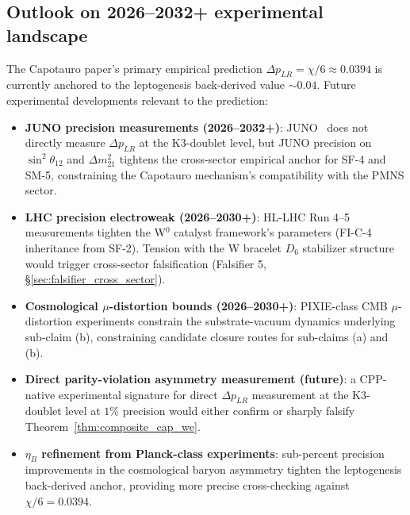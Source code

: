 \documentclass[11pt,letterpaper]{article}
\newcommand{\DeltapLR}{\Delta p_{LR}}
\begin{document}
\subsection{Outlook on 2026--2032+ experimental landscape}\label{sec:outlook}

The Capotauro paper's primary empirical prediction $\DeltapLR = \chi/6 \approx 0.0394$ is currently anchored to the leptogenesis back-derived value $\sim 0.04$. Future experimental developments relevant to the prediction:

\begin{itemize}\setlength\itemsep{0.2em}
    \item \textbf{JUNO precision measurements (2026--2032+)}: JUNO~\cite{juno_2025} does not directly measure $\DeltapLR$ at the K3-doublet level, but JUNO precision on $\sin^2\theta_{12}$ and $\Delta m^2_{21}$ tightens the cross-sector empirical anchor for SF-4 and SM-5, constraining the Capotauro mechanism's compatibility with the PMNS sector.
    \item \textbf{LHC precision electroweak (2026--2030+)}: HL-LHC Run 4--5 measurements tighten the W$^0$ catalyst framework's parameters (FI-C-4 inheritance from SF-2). Tension with the W bracelet $D_6$ stabilizer structure would trigger cross-sector falsification (Falsifier 5, \S\ref{sec:falsifier_cross_sector}).
    \item \textbf{Cosmological $\mu$-distortion bounds (2026--2030+)}: PIXIE-class CMB $\mu$-distortion experiments constrain the substrate-vacuum dynamics underlying sub-claim (b), constraining candidate closure routes for sub-claims (a) and (b).
    \item \textbf{Direct parity-violation asymmetry measurement (future)}: a CPP-native experimental signature for direct $\DeltapLR$ measurement at the K3-doublet level at $1\%$ precision would either confirm or sharply falsify Theorem~\ref{thm:composite_cap_we}.
    \item \textbf{$\eta_B$ refinement from Planck-class experiments}: sub-percent precision improvements in the cosmological baryon asymmetry tighten the leptogenesis back-derived anchor, providing more precise cross-checking against $\chi/6 = 0.0394$.

\end{itemize}
\end{document}
